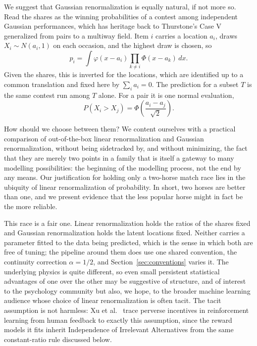 \documentclass[11pt]{article}
\theoremstyle{italichead}
\begin{document}
We suggest that Gaussian renormalization is equally natural, if not more so. Read the shares as
the winning probabilities of a contest among independent Gaussian performances, which has
heritage back to Thurstone's Case V \cite{thurstone1927} generalized from pairs to a multiway
field. Item $i$
carries a location $a_i$, draws $X_i \sim N(a_i,1)$ on each occasion, and the highest draw is
chosen, so
\begin{equation}
p_i = \int \varphi(x - a_i) \prod_{k \neq i} \Phi(x - a_k)\, dx.
\label{eq:winprob}
\end{equation}
Given the shares, this is inverted for the locations, which are identified up to a common
translation and fixed here by $\sum_i a_i = 0$. The prediction for a subset $T$ is the same
contest run among $T$ alone. For a pair it is one normal evaluation,
\begin{equation}
P(X_i > X_j) = \Phi\!\left(\frac{a_i - a_j}{\sqrt{2}}\right).
\label{eq:pair}
\end{equation}

How should we choose between them? We content ourselves with a practical comparison of out-of-the-box linear renormalization and
Gaussian renormalization, without being sidetracked by, and without minimizing, the fact that
they are merely two points in a family that is itself a gateway to many modelling possibilities:
the beginning of the modelling process, not the end by any means. Our justification for holding
only a two-horse match race lies in the ubiquity of linear renormalization of probability. In
short, two horses are better than one, and we present evidence that the less popular horse might
in fact be the more reliable.

This race is a fair one. Linear renormalization holds the ratios of the shares fixed and Gaussian
renormalization holds the latent locations fixed. Neither carries a parameter fitted to the data
being predicted, which is the sense in which both are free of tuning; the pipeline around them
does use one shared convention, the continuity correction $\alpha = 1/2$, and
Section~\ref{sec:conventions} varies it. The underlying physics is quite different, so even small persistent statistical
advantages of one over the other may be suggestive of structure, and of interest to the
psychology community but also, we hope, to the broader machine learning audience whose choice of
linear renormalization is often tacit. The tacit assumption is not harmless: Xu et al.\
\cite{xu2023rlhf} trace perverse incentives in reinforcement learning from human feedback to
exactly this assumption, since the reward models it fits inherit Independence of Irrelevant
Alternatives from the same constant-ratio rule discussed below.
\end{document}
